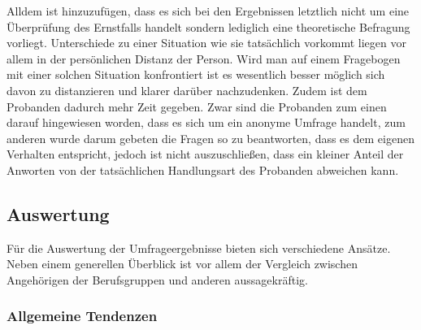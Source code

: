 Alldem ist hinzuzufügen, dass es sich bei den Ergebnissen letztlich nicht um eine Überprüfung des Ernstfalls handelt sondern lediglich eine theoretische Befragung vorliegt.
Unterschiede zu einer Situation wie sie tatsächlich vorkommt liegen vor allem in der persönlichen Distanz der Person.
Wird man auf einem Fragebogen mit einer solchen Situation konfrontiert ist es wesentlich besser möglich sich davon zu distanzieren und klarer darüber nachzudenken.
Zudem ist dem Probanden dadurch mehr Zeit gegeben.
Zwar sind die Probanden zum einen darauf hingewiesen worden, dass es sich um ein anonyme Umfrage handelt, zum anderen wurde darum gebeten die Fragen so zu beantworten, dass es dem eigenen Verhalten entspricht, jedoch ist nicht auszuschließen, dass ein kleiner Anteil der Anworten von der tatsächlichen Handlungsart des Probanden abweichen kann.


\subsection{Auswertung}

Für die Auswertung der Umfrageergebnisse bieten sich verschiedene Ansätze.
Neben einem generellen Überblick ist vor allem der Vergleich zwischen Angehörigen der Berufsgruppen  und anderen aussagekräftig.

\subsubsection{Allgemeine Tendenzen}

